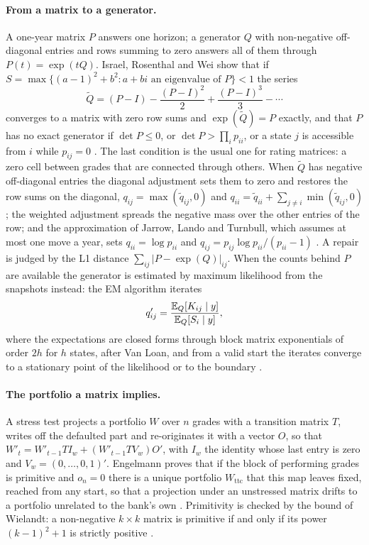 \paragraph{From a matrix to a generator.} A one-year matrix $P$ answers one horizon; a generator $Q$ with non-negative off-diagonal entries and rows summing to zero answers all of them through $P(t)=\exp(tQ)$. Israel, Rosenthal and Wei show that if $S=\max\{(a-1)^2+b^2: a+bi\text{ an eigenvalue of }P\}<1$ the series
\begin{equation}
\tilde Q=(P-I)-\frac{(P-I)^2}{2}+\frac{(P-I)^3}{3}-\cdots
\label{eq:ratings-logseries}
\end{equation}
converges to a matrix with zero row sums and $\exp(\tilde Q)=P$ exactly, and that $P$ has no exact generator if $\det P\le 0$, or $\det P>\prod_i p_{ii}$, or a state $j$ is accessible from $i$ while $p_{ij}=0$ \citep{ratings:israel2001}. The last condition is the usual one for rating matrices: a zero cell between grades that are connected through others. When $\tilde Q$ has negative off-diagonal entries the diagonal adjustment sets them to zero and restores the row sums on the diagonal, $q_{ij}=\max(\tilde q_{ij},0)$ and $q_{ii}=\tilde q_{ii}+\sum_{j\ne i}\min(\tilde q_{ij},0)$; the weighted adjustment spreads the negative mass over the other entries of the row; and the approximation of Jarrow, Lando and Turnbull, which assumes at most one move a year, sets $q_{ii}=\log p_{ii}$ and $q_{ij}=p_{ij}\log p_{ii}/(p_{ii}-1)$ \citep{ratings:israel2001,ratings:jarrow1997}. A repair is judged by the L1 distance $\sum_{ij}|P-\exp(Q)|_{ij}$. When the counts behind $P$ are available the generator is estimated by maximum likelihood from the snapshots instead: the EM algorithm iterates
\begin{equation}
q'_{ij}=\frac{\mathbb{E}_Q[K_{ij}\mid y]}{\mathbb{E}_Q[S_i\mid y]},
\label{eq:ratings-em}
\end{equation}
where the expectations are closed forms through block matrix exponentials of order $2h$ for $h$ states, after Van Loan, and from a valid start the iterates converge to a stationary point of the likelihood or to the boundary \citep{ratings:smith2018,ratings:bladt2005,ratings:vanloan1978}.

\paragraph{The portfolio a matrix implies.} A stress test projects a portfolio $W$ over $n$ grades with a transition matrix $T$, writes off the defaulted part and re-originates it with a vector $O$, so that $W'_t=W'_{t-1}T I_w+(W'_{t-1}T V_w)O'$, with $I_w$ the identity whose last entry is zero and $V_w=(0,\dots,0,1)'$. Engelmann proves that if the block of performing grades is primitive and $o_n=0$ there is a unique portfolio $W_{\mathrm{ttc}}$ that this map leaves fixed, reached from any start, so that a projection under an unstressed matrix drifts to a portfolio unrelated to the bank's own \citep{ratings:engelmann2024}. Primitivity is checked by the bound of Wielandt: a non-negative $k\times k$ matrix is primitive if and only if its power $(k-1)^2+1$ is strictly positive \citep{ratings:wielandt1950}.

